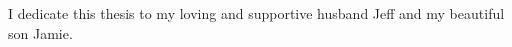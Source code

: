 \noindent
\vspace{1cm}
\begin{spacing}{1} 
    \centering 
    \begin{flushright}
\noindent I dedicate this thesis to my loving and supportive husband Jeff and my
beautiful son Jamie.
\end{flushright}

\end{spacing}
